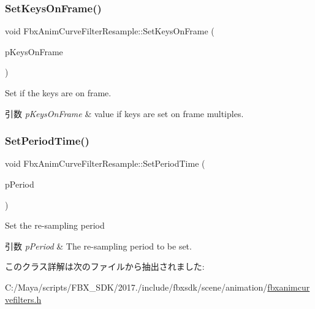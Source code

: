 \subsubsection{\texorpdfstring{Set\+Keys\+On\+Frame()}{SetKeysOnFrame()}}
{\footnotesize\ttfamily void Fbx\+Anim\+Curve\+Filter\+Resample\+::\+Set\+Keys\+On\+Frame (\begin{DoxyParamCaption}\item[{bool}]{p\+Keys\+On\+Frame }\end{DoxyParamCaption})}

Set if the keys are on frame. 
\begin{DoxyParams}{引数}
{\em p\+Keys\+On\+Frame} & value if keys are set on frame multiples. \\
\hline
\end{DoxyParams}
\mbox{\label{class_fbx_anim_curve_filter_resample_a1d2369b1cd4a656a79e05b10f7faadd4}} 
\subsubsection{\texorpdfstring{Set\+Period\+Time()}{SetPeriodTime()}}
{\footnotesize\ttfamily void Fbx\+Anim\+Curve\+Filter\+Resample\+::\+Set\+Period\+Time (\begin{DoxyParamCaption}\item[{\hyperlink{class_fbx_time}{Fbx\+Time} \&}]{p\+Period }\end{DoxyParamCaption})}

Set the re-\/sampling period 
\begin{DoxyParams}{引数}
{\em p\+Period} & The re-\/sampling period to be set. \\
\hline
\end{DoxyParams}


このクラス詳解は次のファイルから抽出されました\+:\begin{DoxyCompactItemize}
\item 
C\+:/\+Maya/scripts/\+F\+B\+X\+\_\+\+S\+D\+K/2017./include/fbxsdk/scene/animation/\hyperlink{fbxanimcurvefilters_8h}{fbxanimcurvefilters.\+h}\end{DoxyCompactItemize}
